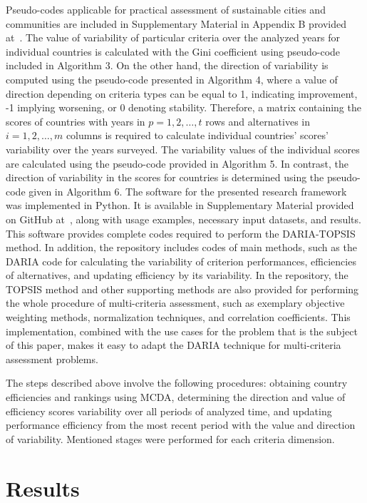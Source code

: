 \documentclass[5p,times]{elsarticle}
\newcounter{example}[section]
\begin{document}
Pseudo-codes applicable for practical assessment of sustainable cities and communities are included in Supplementary Material in Appendix B provided at~\cite{dariagithub2022}.
The value of variability of particular criteria over the analyzed years for individual countries is calculated with the Gini coefficient using pseudo-code included in Algorithm 3. On the other hand, the direction of variability is computed using the pseudo-code presented in Algorithm 4, where a value of direction depending on criteria types can be equal to 1, indicating improvement, -1 implying worsening, or 0 denoting stability. Therefore, a matrix containing the scores of countries with years in $p = 1, 2, \ldots, t$ rows and alternatives in $i = 1, 2, \ldots, m$ columns is required to calculate individual countries' scores' variability over the years surveyed. The variability values of the individual scores are calculated using the pseudo-code provided in Algorithm 5. In contrast, the direction of variability in the scores for countries is determined using the pseudo-code given in Algorithm 6. The software for the presented research framework was implemented in Python. It is available in Supplementary Material provided on GitHub at~\cite{dariagithub2022}, along with usage examples, necessary input datasets, and results. This software provides complete codes required to perform the DARIA-TOPSIS method. In addition, the repository includes codes of main methods, such as the DARIA code for calculating the variability of criterion performances, efficiencies of alternatives, and updating efficiency by its variability. In the repository, the TOPSIS method and other supporting methods are also provided for performing the whole procedure of multi-criteria assessment, such as exemplary objective weighting methods, normalization techniques, and correlation coefficients. This implementation, combined with the use cases for the problem that is the subject of this paper, makes it easy to adapt the DARIA technique for multi-criteria assessment problems.

The steps described above involve the following procedures: obtaining country efficiencies and rankings using MCDA, determining the direction and value of efficiency scores variability over all periods of analyzed time, and updating performance efficiency from the most recent period with the value and direction of variability. Mentioned stages were performed for each criteria dimension.

\section{Results}
\label{sec:results}
\end{document}
